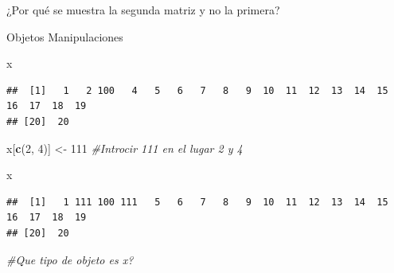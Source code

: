 \documentclass[
  ignorenonframetext,
]{beamer}
\newenvironment{Shaded}{\begin{snugshade}}{\end{snugshade}}
\newcommand{\CommentTok}[1]{\textcolor[rgb]{0.56,0.35,0.01}{\textit{#1}}}
\newcommand{\DecValTok}[1]{\textcolor[rgb]{0.00,0.00,0.81}{#1}}
\newcommand{\FunctionTok}[1]{\textcolor[rgb]{0.13,0.29,0.53}{\textbf{#1}}}
\newcommand{\NormalTok}[1]{#1}
\newcommand{\OtherTok}[1]{\textcolor[rgb]{0.56,0.35,0.01}{#1}}
\begin{document}
\begin{frame}[fragile]{¿Por qué se muestra la segunda matriz y no la
primera?}
\begin{block}{Objetos \textbar{} Manipulaciones}
\begin{Shaded}
\begin{Highlighting}[]
\NormalTok{x}
\end{Highlighting}
\end{Shaded}

\begin{verbatim}
##  [1]   1   2 100   4   5   6   7   8   9  10  11  12  13  14  15  16  17  18  19
## [20]  20
\end{verbatim}

\begin{Shaded}
\begin{Highlighting}[]
\NormalTok{x[}\FunctionTok{c}\NormalTok{(}\DecValTok{2}\NormalTok{, }\DecValTok{4}\NormalTok{)] }\OtherTok{\textless{}{-}} \DecValTok{111} \CommentTok{\#Introcir 111 en el lugar 2 y 4}

\NormalTok{x}
\end{Highlighting}
\end{Shaded}

\begin{verbatim}
##  [1]   1 111 100 111   5   6   7   8   9  10  11  12  13  14  15  16  17  18  19
## [20]  20
\end{verbatim}

\begin{Shaded}
\begin{Highlighting}[]
\CommentTok{\#Que tipo de objeto es x?}
\end{Highlighting}
\end{Shaded}
\end{block}
\end{frame}
\end{document}
